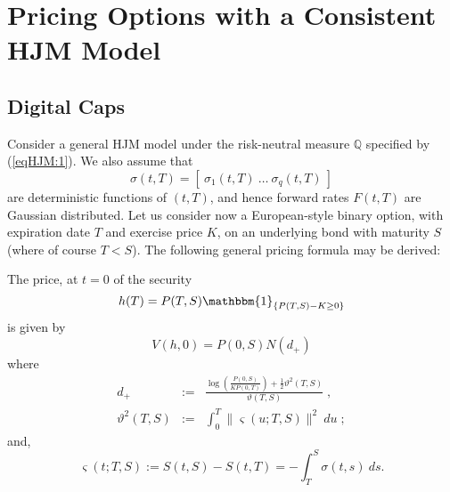 \chapter{Pricing Options with a Consistent HJM Model}
\section*{Digital Caps}
Consider a general HJM model under the risk-neutral measure
$\mathbb{Q}$ specified by (\ref{eqHJM:1}). We also assume that 
$$
\sigma(t,T)= \left[\:\sigma_1(t,T)\:\dots\:\sigma_q(t,T)\:\right]
$$
are deterministic functions of $(t,T)$, and hence forward rates
$F(t,T)$ are Gaussian distributed. Let us consider now a
European-style binary option, with expiration date $T$ and exercise
price $K$, on an underlying bond with maturity $S$ (where of course
$T<S$). The following general pricing formula may be derived:
\begin{propos} The price, at $t=0$ of the security
$$
h(T)=P(T,S) \mathbbm{1}_{ \{ P(T,S)-K \geq 0\} }
$$
is given by
\begin{equation} 
V(h,0)=P(0,S)N(d_+)
\end{equation}
where
\begin{equation}
\begin{array}{rcl}
d_+ & := & \displaystyle \frac{\log\left(\frac{P(0,S)}{K
      P(0,T)}\right) + \frac{1}{2}\vartheta^2(T,S)}{\vartheta(T,S)}\; , \\ 
\vartheta^2(T,S) & := &\displaystyle \int_0^T \| \varsigma(u;T,S)
\|^2\:du\; ;
\end{array}
\end{equation}
and,
\begin{equation}
\varsigma(t;T,S) := S(t,S)-S(t,T)=-\int_T^S \sigma(t,s)\: ds.
\end{equation}
\end{propos}
